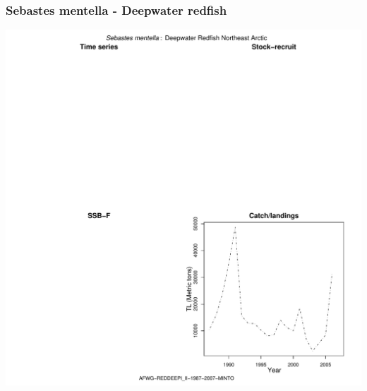 \subsubsection{Sebastes mentella - Deepwater redfish}
\begin{center}
\includegraphics[width=1.2\textwidth]{../R/figures/AFWG-REDDEEPI_II-1987-2007-MINTO.pdf}
\end{center}

